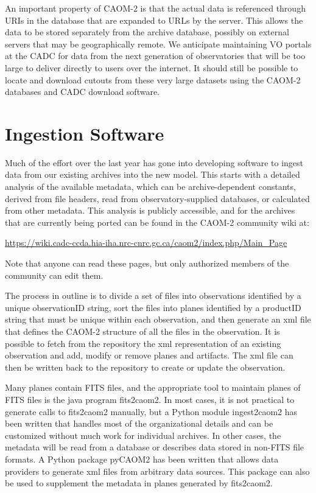 An important property of CAOM-2 is that the actual data is referenced through URIs in the database that are expanded to URLs by the server.  This allows the data to be stored separately from the archive database, possibly on external servers that may be geographically remote.  We anticipate maintaining VO portals at the CADC for data from the next generation of observatories that will be too large to deliver directly to users over the internet.  It should still be possible to locate and download cutouts from these very large datasets using the CAOM-2 databases and CADC download software.

\section{Ingestion Software}
Much of the effort over the last year has gone into developing software to ingest data from our existing archives into the new model.  This starts with a detailed analysis of the available metadata, which can be archive-dependent constants, derived from file headers, read from observatory-supplied databases, or calculated from other metadata.  This analysis is publicly accessible, and for the archives that are currently being ported can be found in the CAOM-2 community wiki at: 
\begin{center}
{\small \url{https://wiki.cadc-ccda.hia-iha.nrc-cnrc.gc.ca/caom2/index.php/Main_Page}}  
\end{center}
Note that anyone can read these pages, but only authorized members of the community can edit them.  

The process in outline is to divide a set of files into observations identified by a unique observationID string, sort the files into planes identified by a productID string that must be unique within each observation, and then generate an xml file that defines the CAOM-2 structure of all the files in the observation.  It is possible to fetch from the repository the xml representation of an existing observation and add, modify or remove planes and artifacts.  The xml file can then be written back to the repository to create or update the observation.

Many planes contain FITS files, and the appropriate tool to maintain planes of FITS files is the java program fits2caom2.  In most cases, it is not practical to generate calls to fits2caom2 manually, but a Python module ingest2caom2 has been written that handles most of the organizational details and can be customized without much work for individual archives.  In other cases, the metadata will be read from a database or describes data stored in non-FITS file formats.  A Python package pyCAOM2 has been written that allows data providers to generate xml files from arbitrary data sources.  This package can also be used to supplement the metadata in planes generated by fits2caom2.  

